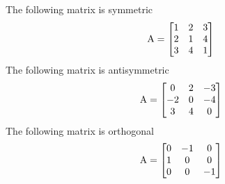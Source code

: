 \begin{example}
    The following matrix is symmetric
    $$
        \mathrm{A} = \left[\begin{matrix}
        1 & 2 & 3 \\
        2 & 1 & 4 \\
        3 & 4 & 1
        \end{matrix}\right]
    $$
    The following matrix is antisymmetric
    \renewcommand*{\arraystretch}{1.5}
    $$
        \mathrm{A} = \left[\begin{matrix}
        0 & 2 & -3 \\
        -2 & 0 & -4 \\
        3 & 4 & 0
        \end{matrix}\right]
    $$
    The following matrix is orthogonal
    $$
        \mathrm{A} = \left[\begin{matrix}
        0 & -1 & 0 \\
        1 & 0 & 0 \\
        0 & 0 & -1
        \end{matrix}\right]
    $$
\end{example}